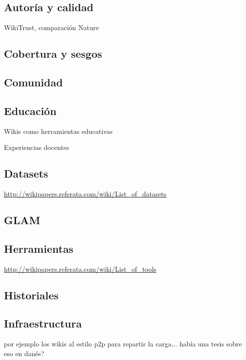 \documentclass[11pt,onecolumn]{article}
\begin{document}
\subsection{Autoría y calidad}

WikiTrust, comparación Nature


\subsection{Cobertura y sesgos}


\subsection{Comunidad}


\subsection{Educación}


Wikis como herramientas educativas

Experiencias docentes

\subsection{Datasets}

\href{http://wikipapers.referata.com/wiki/List_of_datasets}{http://wikipapers.referata.com/wiki/List\_of\_datasets}


\subsection{GLAM}


\subsection{Herramientas}

\href{http://wikipapers.referata.com/wiki/List_of_tools}{http://wikipapers.referata.com/wiki/List\_of\_tools}

\subsection{Historiales}

\subsection{Infraestructura}

por ejemplo los wikis al estilo p2p para repartir la carga... había una tesis sobre eso en danés?
\end{document}
